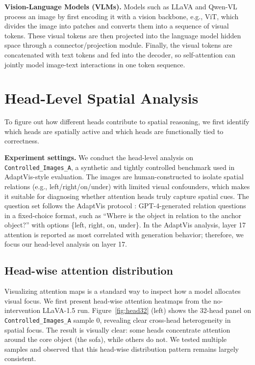 \documentclass{article}
\begin{document}
\textbf{Vision-Language Models (VLMs).}
Models such as LLaVA and Qwen-VL
\citep{liu2023visual,bai2023qwen} process an image by first encoding it
with a vision backbone, e.g., ViT, which divides the image
into patches and converts them into a sequence of visual tokens.
These visual tokens are then projected into the
language model hidden space through a connector/projection module.
Finally, the visual tokens are concatenated with text tokens 
and fed into the decoder, so self-attention can jointly model
image-text interactions in one token sequence.

\section{Head-Level Spatial Analysis}
\noindent To figure out how different heads contribute
 to spatial reasoning, we first identify which heads are
spatially active and which heads are functionally tied to correctness.

\textbf{Experiment settings.}
We conduct the head-level analysis on \texttt{Controlled\_Images\_A}, a
synthetic and tightly controlled benchmark used in AdaptVis-style
evaluation. The images are human-constructed to isolate spatial
relations (e.g., left/right/on/under) with limited visual confounders,
which makes it suitable for diagnosing whether attention heads truly
capture spatial cues. The question set follows the AdaptVis protocol
\citep{chen2024adaptvis}: GPT-4-generated relation questions in a fixed-choice
format, such as ``Where is the object in relation to the anchor
object?'' with options \{left, right, on, under\}. In the AdaptVis
analysis, layer 17 attention is reported as most correlated with
generation behavior; therefore, we focus our head-level analysis on
layer 17.

\subsection{Head-wise attention distribution}

Visualizing attention maps is a standard way to inspect how a model
allocates visual focus. We first present head-wise attention heatmaps
from the no-intervention LLaVA-1.5 run.
Figure~\ref{fig:head32} (left) shows the 32-head panel on
\texttt{Controlled\_Images\_A} sample 0, revealing clear cross-head
heterogeneity in spatial focus.
The result is visually clear: some heads concentrate attention around
the core object (the sofa), while others do not. We tested multiple
samples and observed that this head-wise distribution pattern remains
largely consistent.
\end{document}
